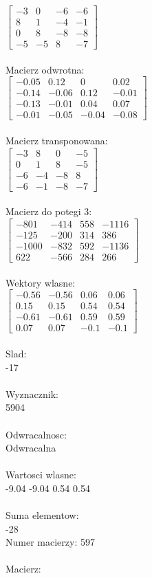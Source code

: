 \documentclass[a4paper,12pt]{article}
\begin{document}
$\begin{bmatrix} -3&0&-6&-6\\8&1&-4&-1\\0&8&-8&-8\\-5&-5&8&-7 \end{bmatrix}$
\\
\\
Macierz odwrotna:\\

$\begin{bmatrix} -0.05&0.12&0&0.02\\-0.14&-0.06&0.12&-0.01\\-0.13&-0.01&0.04&0.07\\-0.01&-0.05&-0.04&-0.08 \end{bmatrix}$
\\
\\
Macierz transponowana:\\

$\begin{bmatrix} -3&8&0&-5\\0&1&8&-5\\-6&-4&-8&8\\-6&-1&-8&-7 \end{bmatrix}$
\\
\\
Macierz do potegi 3:\\

$\begin{bmatrix} -801&-414&558&-1116\\-125&-200&314&386\\-1000&-832&592&-1136\\622&-566&284&266 \end{bmatrix}$
\\
\\
Wektory wlasne:\\

$\begin{bmatrix} -0.56&-0.56&0.06&0.06\\0.15&0.15&0.54&0.54\\-0.61&-0.61&0.59&0.59\\0.07&0.07&-0.1&-0.1 \end{bmatrix}$
\\
\\
Slad:\\
-17
\\
\\
Wyznacznik:\\
5904
\\
\\
Odwracalnosc:\\
Odwracalna
\\
\\
Wartosci wlasne:\\
-9.04 -9.04 0.54 0.54
\\
\\
Suma elementow:\\
-28
\\
\newpage
Numer macierzy:
597
\\
\\
Macierz:\\
\end{document}
